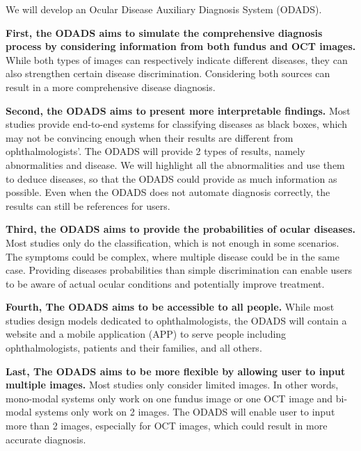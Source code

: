 \documentclass{article}
\begin{document}
		We will develop an Ocular Disease Auxiliary Diagnosis System (ODADS). 
		
		\vspace{0.3cm}
		
		\textbf{First, the ODADS aims to simulate the comprehensive diagnosis process by considering information from both fundus and OCT images.} While both types of images can respectively indicate different diseases, they can also strengthen certain disease discrimination.  Considering both sources can result in a more comprehensive disease diagnosis.
		
		\vspace{0.1cm}
		
		\textbf{Second, the ODADS aims to present more interpretable findings.}  Most studies provide end-to-end systems for classifying diseases as black boxes, which may not be convincing enough when their results are different from ophthalmologists'.  The ODADS will provide 2 types of results, namely abnormalities and disease.  We will highlight all the abnormalities and use them to deduce diseases, so that the ODADS could provide as much information as possible.  Even when the ODADS does not automate diagnosis correctly, the results can still be references for users.
		
		\vspace{0.1cm}
		
		\textbf{Third, the ODADS aims to provide the probabilities of ocular diseases.}  Most studies only do the classification, which is not enough in some scenarios.  The symptoms could be complex, where multiple disease could be in the same case.  Providing diseases probabilities than simple discrimination can enable users to be aware of actual ocular conditions and potentially improve treatment.
		
		\vspace{0.1cm}
		
		\textbf{Fourth, The ODADS aims to be accessible to all people.}  While most studies design models dedicated to ophthalmologists, the ODADS will contain a website and a mobile application (APP) to serve people including ophthalmologists, patients and their families, and all others.

		\vspace{0.1cm}

		\textbf{Last, The ODADS aims to be more flexible by allowing user to input multiple images.}  Most studies only consider limited images.  In other words, mono-modal systems only work on one fundus image or one OCT image and bi-modal systems only work on 2 images.  The ODADS will enable user to input more than 2 images, especially for OCT images, which could result in more accurate diagnosis. 
		
\end{document}
